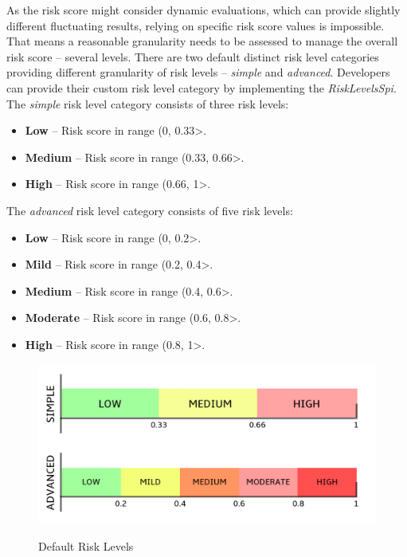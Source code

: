 As the risk score might consider dynamic evaluations, which can provide slightly different fluctuating results, relying on specific risk score values is impossible.
That means a reasonable granularity needs to be assessed to manage the overall risk score -- several levels.
There are two default distinct risk level categories providing different granularity of risk levels -- \textit{simple} and \textit{advanced}.
Developers can provide their custom risk level category by implementing the \textit{RiskLevelsSpi}.
\newline
\newline
The \textit{simple} risk level category consists of three risk levels:
\begin{itemize}
    \item \textbf{Low} -- Risk score in range (0, 0.33>.
    \item \textbf{Medium} -- Risk score in range (0.33, 0.66>.
    \item \textbf{High} -- Risk score in range (0.66, 1>.
\end{itemize}
\newline
\newline
The \textit{advanced} risk level category consists of five risk levels:
\begin{itemize}
    \item \textbf{Low} -- Risk score in range (0, 0.2>.
    \item \textbf{Mild} -- Risk score in range (0.2, 0.4>.
    \item \textbf{Medium} -- Risk score in range (0.4, 0.6>.
    \item \textbf{Moderate} -- Risk score in range (0.6, 0.8>.
    \item \textbf{High} -- Risk score in range (0.8, 1>.
\end{itemize}

\begin{figure}[htbp]
  \centering
  \includegraphics[width=1\textwidth]{img/sections/5-design/risk-levels.png}
  \label{fig:risk-levels}
  \caption{Default Risk Levels}
\end{figure}

